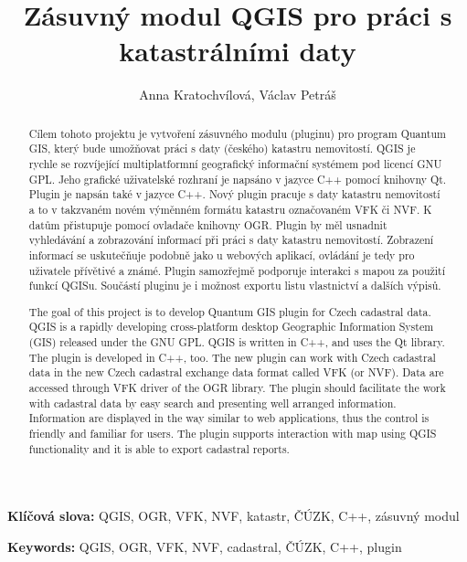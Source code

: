 \documentclass[a4paper,10pt]{article}
\title{Zásuvný modul QGIS pro práci s katastrálními daty}
\author{Anna Kratochvílová, Václav Petráš}
\newcommand{\klicslova}[2]{\noindent\textbf{#1: }#2}
\begin{document}
\pagestyle{empty}

\newpage
\begin{abstract}
Cílem tohoto projektu je vytvoření zásuvného modulu (pluginu) pro program Quantum GIS,
který bude umožňovat práci s daty (českého) katastru nemovitostí.
QGIS je rychle se rozvíjející  multiplatformní geografický informační systémem pod licencí GNU GPL.
Jeho grafické uživatelské rozhraní je napsáno v jazyce C++ pomocí knihovny Qt. Plugin je napsán také v jazyce C++.
Nový plugin pracuje s daty katastru nemovitostí a to v takzvaném novém výměnném formátu katastru označovaném VFK či NVF.
K datům přistupuje pomocí ovladače knihovny OGR. Plugin by měl usnadnit vyhledávání a zobrazování
informací při práci s daty katastru nemovitostí.
Zobrazení informací se uskutečňuje podobně jako u webových aplikací, ovládání je tedy pro uživatele přívětivé a známé.
Plugin samozřejmě podporuje interakci s mapou za použití funkcí QGISu.
Součástí pluginu je i možnost exportu listu vlastnictví a dalších výpisů.
\end{abstract}

\bigskip

\klicslova{Klíčová slova}{QGIS, OGR, VFK, NVF, katastr, ČÚZK, C++, zásuvný modul}
\begin{abstract}
The goal of this project is to develop Quantum GIS plugin for Czech cadastral data.
QGIS is a rapidly developing cross-platform desktop Geographic Information System (GIS) released under the GNU GPL.
QGIS is written in C++, and uses the Qt library.
The plugin is developed in C++, too.
The new plugin can work with Czech cadastral data in the new Czech cadastral exchange data format called VFK (or NVF).
Data are accessed through VFK driver of the OGR library.
The plugin should facilitate the work with cadastral data by easy search and presenting well arranged information.
Information are displayed in the way similar to web applications, thus the control is friendly and familiar for users.
The plugin supports interaction with map using QGIS functionality and it is able to export cadastral reports.
\end{abstract}

\bigskip

\klicslova{Keywords}{QGIS, OGR, VFK, NVF, cadastral, ČÚZK, C++, plugin}
\newpage


\tableofcontents
\newpage
\end{document}
